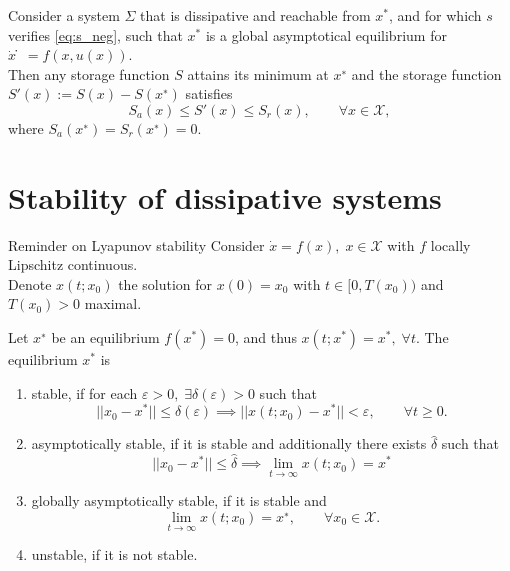 \documentclass[aspectratio=169]{beamer}
\begin{document}
\begin{frame}
\begin{corollary}
	Consider a system $\Sigma$ that is dissipative and reachable from $x^*$, and for which $s$ verifies \eqref{eq:s_neg}, such that $x^*$ is a
	global asymptotical equilibrium for $\dot{x}̇=f(x, u(x))$.\\
	
	Then any storage function $S$ 	attains its minimum at $x^∗$ and the storage function $S'(x) := S(x) − S(x^∗)$ satisfies
	\begin{equation*}
		S_a(x) \le S'(x) \le S_r(x), \qquad \forall x \in \mathcal{X},
	\end{equation*}
	where $S_a(x^∗) = S_r (x^∗) = 0$.
\end{corollary}
\end{frame}

\section{Stability of dissipative systems}

\begin{frame}{Reminder on Lyapunov stability}
Consider $\dot{x}=f(x), \; x \in \mathcal{X}$ with $f$ locally Lipschitz continuous.\\
Denote $x(t; x_0)$ the solution for $x(0)=x_0$ with $t \in [0, T(x_0))$ and $T(x_0)>0$ maximal.

\begin{definition}[Stability]
	Let $x^∗$ be an equilibrium $f(x^*) = 0$, and thus
	$x(t; x^*) = x^*, \; \forall t$. The equilibrium $x^*$ is
	\begin{enumerate}
	 \item stable, if for each $\varepsilon>0, \; \exists \delta(\varepsilon)>0$ such that
	 \begin{equation*}
	 	||x_0 - x^*|| \le \delta(\varepsilon) \implies ||x(t; x_0) - x^*||< \varepsilon, \qquad \forall t \ge 0.
	 \end{equation*}
	 \item asymptotically stable, if it is stable and additionally there exists $\widehat{\delta}$ such that
	 \begin{equation*}
	 	||x_0 - x^*|| \le \widehat{\delta} \implies \lim_{t \rightarrow \infty} x(t; x_0) = x^*
	 \end{equation*}
	 \item globally asymptotically stable, if it is stable and 
	 $$\lim_{t \rightarrow \infty} x(t; x_0) = x^∗, \qquad \forall x_0 \in \mathcal{X}.$$
	 \item unstable, if it is not stable.
	\end{enumerate}
\end{definition}

\end{frame}
\end{document}
